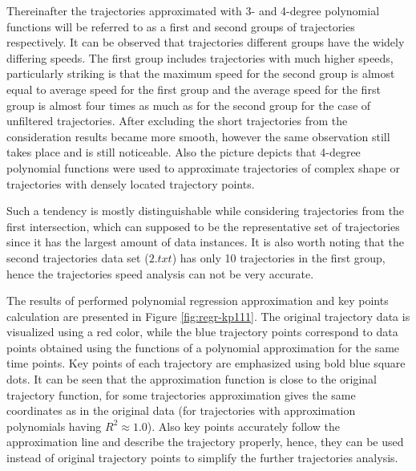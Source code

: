 Thereinafter the trajectories approximated with 3- and 4-degree polynomial functions will be referred to as a first and second groups of trajectories respectively. It can be observed that trajectories different groups have the widely differing speeds. The first group includes trajectories with much higher speeds, particularly striking is that the maximum speed for the second group is almost equal to average speed for the first group and the average speed for the first group is almost four times as much as for the second group for the case of unfiltered trajectories. After excluding the short trajectories from the consideration results became more smooth, however the same observation still takes place and is still noticeable. Also the picture depicts that 4-degree polynomial functions were used to approximate trajectories of complex shape or trajectories with densely located trajectory points. 

Such a tendency is mostly distinguishable while considering trajectories from the first intersection, which can supposed to be the representative set of trajectories since it has the largest amount of data instances. It is also worth noting that the second trajectories data set ($2.txt$) has only 10 trajectories in the first group, hence the trajectories speed analysis can not be very accurate.

The results of performed polynomial regression approximation and key points calculation are presented in Figure \ref{fig:regr-kp111}. The original trajectory data is visualized using a red color, while the blue trajectory points correspond to data points obtained using the functions of a polynomial approximation for the same time points. Key points of each trajectory are emphasized using bold blue square dots. It can be seen that the approximation function is close to the original trajectory function, for some trajectories approximation gives the same coordinates as in the original data (for trajectories with approximation polynomials having $R^2 \approx 1.0$). Also key points accurately follow the approximation line and describe the trajectory properly, hence, they can be used instead of original trajectory points to simplify the further trajectories analysis. 


